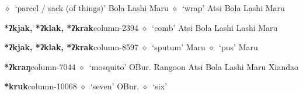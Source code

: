          $\diamond$~`parcel / sack (of things)'
         Bola 
\hspace{1ex}
         Lashi 
\hspace{1ex}
         Maru 
\hspace{1ex}
         $\diamond$~`wrap'
         Atsi 
\hspace{1ex}
         Bola 
\hspace{1ex}
         Lashi 
\hspace{1ex}
         Maru 
  \item {\footnotesize \textbf{*ʔkjak, *ʔklak, *ʔkrak}}{\tiny column-2394}
         $\diamond$~`comb'
         Atsi 
\hspace{1ex}
         Bola 
\hspace{1ex}
         Lashi 
\hspace{1ex}
         Lashi 
\hspace{1ex}
         Maru 
  \item {\footnotesize \textbf{*ʔkjak, *ʔklak, *ʔkrak}}{\tiny column-8597}
         $\diamond$~`sputum'
         Maru 
\hspace{1ex}
         $\diamond$~`pus'
         Maru 
  \item {\footnotesize \textbf{*ʔkraŋ}}{\tiny column-7044}
         $\diamond$~`mosquito'
         OBur. 
\hspace{1ex}
         Rangoon 
\hspace{1ex}
         Atsi 
\hspace{1ex}
         Bola 
\hspace{1ex}
         Lashi 
\hspace{1ex}
         Maru 
\hspace{1ex}
         Xiandao 
  \item {\footnotesize \textbf{*kruk}}{\tiny column-10068}
         $\diamond$~`seven'
         OBur. 
\hspace{1ex}
         $\diamond$~`six'
